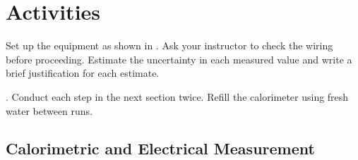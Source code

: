 \section{Activities}
Set up the equipment as shown in .  Ask your instructor to check the wiring before proceeding.  Estimate the uncertainty in each measured value and write a brief justification for each estimate. 

.  Conduct each step in the next section twice.  Refill the calorimeter using fresh water between runs.

\subsection{Calorimetric and Electrical Measurement}

